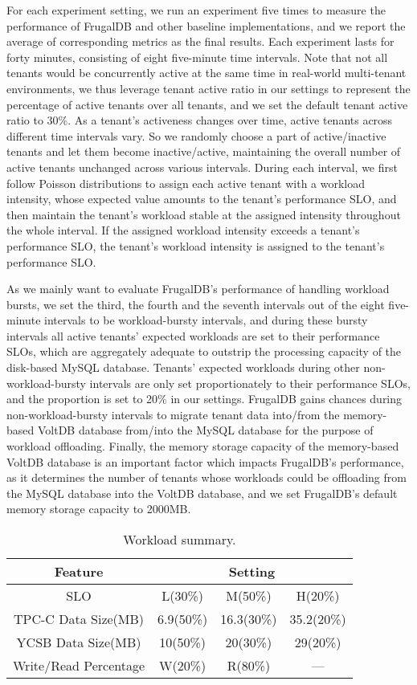 For each experiment setting, we run an experiment five times to measure the performance of FrugalDB and other baseline implementations, and we report the average of corresponding metrics as the final results. Each experiment lasts for forty minutes, consisting of eight five-minute time intervals. Note that not all tenants would be concurrently active at the same time in real-world multi-tenant environments, we thus leverage tenant active ratio in our settings to represent the percentage of active tenants over all tenants, and we set the default tenant active ratio to 30\%. As a tenant's activeness changes over time, active tenants across different time intervals vary. So we randomly choose a part of active/inactive tenants and let them become inactive/active, maintaining the overall number of active tenants unchanged across various intervals. During each interval, we first follow Poisson distributions to assign each active tenant with a workload intensity, whose expected value amounts to the tenant's performance SLO, and then maintain the tenant's workload stable at the assigned intensity throughout the whole interval. If the assigned workload intensity exceeds a tenant's performance SLO, the tenant's workload intensity is assigned to the tenant's performance SLO.

As we mainly want to evaluate FrugalDB's performance of handling workload bursts, we set the third, the fourth and the seventh intervals out of the eight five-minute intervals to be workload-bursty intervals, and during these bursty intervals all active tenants' expected workloads are set to their performance SLOs, which are aggregately adequate to outstrip the processing capacity of the disk-based MySQL database. Tenants' expected workloads during other non-workload-bursty intervals are only set proportionately to their performance SLOs, and the proportion is set to 20\% in our settings. FrugalDB gains chances during non-workload-bursty intervals to migrate tenant data into/from the memory-based VoltDB database from/into the MySQL database for the purpose of workload offloading. Finally, the memory storage capacity of the memory-based VoltDB database is an important factor which impacts FrugalDB's performance, as it determines the number of tenants whose workloads could be offloading from the MySQL database into the VoltDB database, and we set FrugalDB's default memory storage capacity to 2000MB.

\begin{table}[!htb]
\caption{Workload summary.}
\label{table:features}
\centering
\begin{tabular}{|c|c|c|c|}
\hline
Feature & \multicolumn{3}{c|}{Setting} \\
\hline
SLO & L(30\%) & M(50\%) & H(20\%) \\
\hline
TPC-C Data Size(MB) & 6.9(50\%) & 16.3(30\%) & 35.2(20\%) \\
\hline
YCSB Data Size(MB) & 10(50\%) & 20(30\%) & 29(20\%) \\
\hline
Write/Read Percentage & W(20\%) & R(80\%) & ---\\
\hline
\end{tabular}
\end{table}

